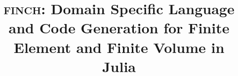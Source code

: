\documentclass[twoside,leqno,twocolumn]{article}
\begin{document}
%

\newcommand{\FMshop}{\textsc{finch}}


\title{\Large \FMshop: Domain Specific Language and Code Generation for Finite Element and Finite Volume in Julia}

\date{}

\maketitle






\end{document}
